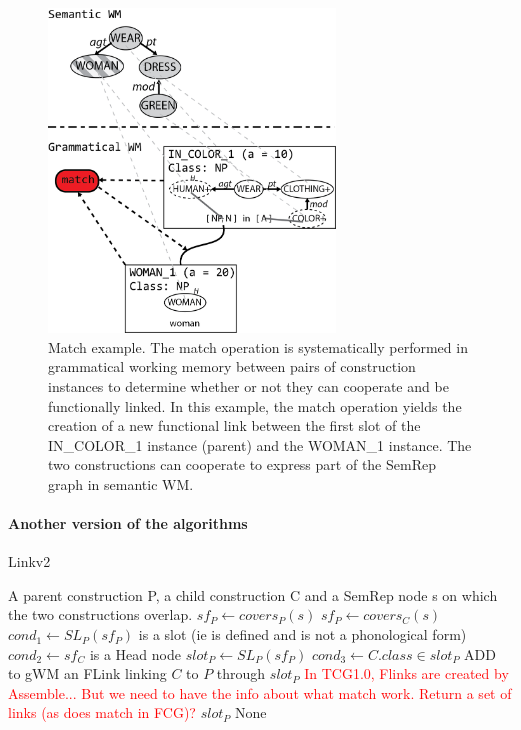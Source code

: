 \documentclass{article}
\newcommand\todo[1]{\textcolor{red}{#1}}
\begin{document}
\begin{figure}[H]
	\centering
	\includegraphics[width=3.0in]{Figures/match.png}
	\caption{Match example. The match operation is systematically performed in grammatical working memory between pairs of construction instances to determine whether or not they can cooperate and be functionally linked. In this example, the match operation yields the creation of a new functional link between the first slot of the IN\_COLOR\_1 instance (parent) and the WOMAN\_1 instance. The two constructions can cooperate to express part of the SemRep graph in semantic WM.}
	\label{fig:match}
\end{figure}

\paragraph{Another version of the algorithms}
\begin{algorithm}[H]
\caption{Linkv2}
\label{linkv2}
\begin{algorithmic}
	\REQUIRE A parent construction P, a child construction C and a SemRep node s on which the two constructions overlap.
	\STATE $sf_P \leftarrow covers_P(s)$
	\STATE $sf_P \leftarrow covers_C(s)$
	\STATE $cond_1 \leftarrow SL_P(sf_P)$ is a slot (ie is defined and is not a phonological form)
	\STATE $cond_2 \leftarrow sf_C$ is a Head node
		\STATE $slot_P \leftarrow SL_P(sf_P)$
		\STATE $cond_3 \leftarrow C.class \in slot_P$
			\STATE ADD to gWM an FLink linking $C$ to $P$ through $slot_P$
			\STATE \todo{In TCG1.0, Flinks are created by Assemble...}
			\STATE \todo{But we need to have the info about what match work. Return a set of links (as does match in FCG)?}
			\RETURN $slot_P$
		\ELSE
			\RETURN None
		\ENDIF
	\ENDIF
\end{algorithmic}	
\end{algorithm}
\end{document}
